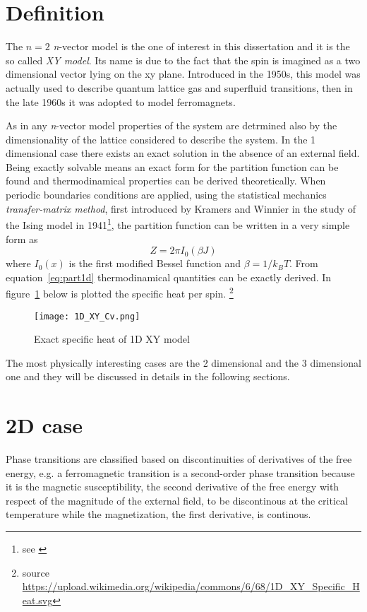 \section{Definition}

The $n=2$ \textit{n}-vector model is the one of interest in this dissertation and 
it is the so called \emph{XY model}. Its name is due to the fact that the spin
is imagined as a two dimensional vector lying on the xy plane. Introduced in the
1950s, this model was actually used to describe quantum lattice gas and superfluid 
transitions, then in the late 1960s it was adopted to model ferromagnets.

As in any \textit{n}-vector model properties of the system are detrmined also
by the dimensionality of the lattice considered to describe the system. In the 1 
dimensional case there exists an exact solution in the absence of an external
field. Being exactly solvable means an exact form for the partition function can
be found and thermodinamical properties can be derived theoretically. When 
periodic boundaries conditions are applied, using the statistical mechanics 
\emph{transfer-matrix method}, first introduced by Kramers and Winnier in the
study of the Ising model in 1941\footnote{see \cite{Kramers1941}}, the 
partition function can be written in a very simple form as 
\begin{equation}
\label{eq:part1d}
Z = 2\pi I_0(\beta J)
\end{equation}
where $I_0(x)$ is the first modified Bessel function and $\beta = 1/k_B T$.
From equation~\ref{eq:part1d} thermodinamical quantities can be exactly derived.
In figure~\ref{fig:1D_XY} below is plotted the specific heat per spin.
\footnote{source 
\url{https://upload.wikimedia.org/wikipedia/commons/6/68/1D_XY_Specific_Heat.svg}} 

\begin{figure}
\label{fig:1D_XY}
\centering
\texttt{[image: 1D\_XY\_Cv.png]}
\caption{Exact specific heat of 1D XY model}
\end{figure}

The most physically interesting cases are the 2 dimensional and the 3 dimensional
one and they will be discussed in details in the following sections.


\section{2D case}

Phase transitions are classified based on discontinuities of derivatives of the 
free energy, e.g. a ferromagnetic transition is a second-order phase transition 
because it is the magnetic susceptibility, the second derivative of the free energy
with respect of the magnitude of the external field, to be discontinous at the 
critical temperature while the magnetization, the first derivative, is continous.

